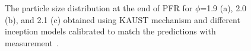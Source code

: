 \begin{figure}[H]
	\centering
	\caption{The particle size distribution at the end of PFR for $\phi$=1.9 (a), 2.0 (b), and 2.1 (c) obtained using KAUST mechanism and different inception models calibrated to match the predictions with measurement~\citep{manzello2007soot}.}
	\label{fig:psrpfr_psd} 
\end{figure}


